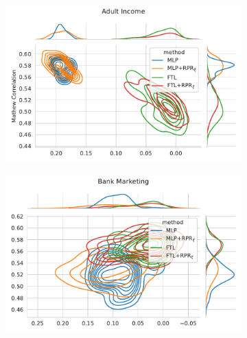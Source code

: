 \begin{figure}
\centering
\caption{Metric distribution optimizing MCC and Statistical Parity in comparison with Redlining Penalty Regularization across multiple resample runs. Corresponding values available at Table~\ref{tab:complete_mcc_parity_rpr}.}
\label{fig:complete_mcc_parity_rpr}
\begin{subfigure}{.45\linewidth}
    \includegraphics[width=1\linewidth]{images/pareto_mcc_parity_adult_rpr.pdf}
\end{subfigure}
\begin{subfigure}{.45\linewidth}
    \includegraphics[width=1\linewidth]{images/pareto_mcc_parity_bank_rpr.pdf}
\end{subfigure}


\end{figure}
